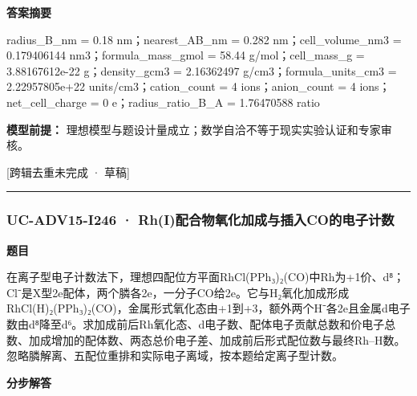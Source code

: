 \documentclass[UTF8,11pt,a4paper]{ctexart}
\begin{document}
\noindent\textbf{答案摘要}\par
radius\_B\_nm = 0.18 nm；nearest\_AB\_nm = 0.282 nm；cell\_volume\_nm3 = 0.179406144 nm3；formula\_mass\_gmol = 58.44 g/mol；cell\_mass\_g = 3.88167612e-22 g；density\_gcm3 = 2.16362497 g/cm3；formula\_units\_cm3 = 2.22957805e+22 units/cm3；cation\_count = 4 ions；anion\_count = 4 ions；net\_cell\_charge = 0 e；radius\_ratio\_B\_A = 1.76470588 ratio\par
\noindent\textbf{模型前提：}
理想模型与题设计量成立；数学自洽不等于现实实验认证和专家审核。\par
\noindent\textcolor{red!65!black}{[跨辑去重未完成 · 草稿]} \par
\medskip\hrule\medskip
{}
\subsubsection*{UC-ADV15-I246 · Rh(I)配合物氧化加成与插入CO的电子计数}
\noindent\textbf{题目}\par
在离子型电子计数法下，理想四配位方平面RhCl(PPh₃)₂(CO)中Rh为+1价、d⁸；Cl⁻是X型2e配体，两个膦各2e，一分子CO给2e。它与H₂氧化加成形成RhCl(H)₂(PPh₃)₂(CO)，金属形式氧化态由+1到+3，额外两个H⁻各2e且金属d电子数由d⁸降至d⁶。求加成前后Rh氧化态、d电子数、配体电子贡献总数和价电子总数、加成增加的配体数、两态总价电子差、加成前后形式配位数与最终Rh–H数。忽略膦解离、五配位重排和实际电子离域，按本题给定离子型计数。\par
\medskip\noindent\textbf{分步解答}
\end{document}
